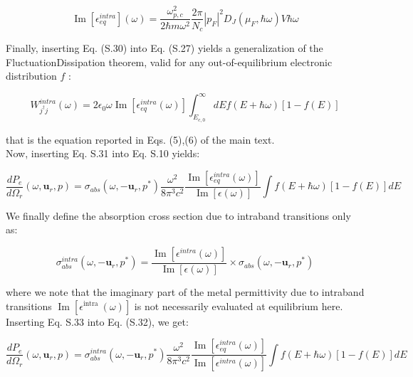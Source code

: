 \documentclass[10pt]{article}
\begin{document}
\begin{equation*}
\operatorname{Im}\left[\epsilon_{e q}^{i n t r a}\right](\omega)=\frac{\omega_{p, c}^{2}}{2 \hbar m \omega^{2}} \frac{2 \pi}{N_{c}}\left|p_{F}\right|^{2} D_{J}\left(\mu_{F}, \hbar \omega\right) V \hbar \omega \tag{S.30}
\end{equation*}


Finally, inserting Eq. (S.30) into Eq. (S.27) yields a generalization of the FluctuationDissipation theorem, valid for any out-of-equilibrium electronic distribution $f$ :


\begin{equation*}
W_{j^{\dagger} j}^{i n t r a}(\omega)=2 \epsilon_{0} \omega \operatorname{Im}\left[\epsilon_{e q}^{i n t r a}(\omega)\right] \int_{E_{c, 0}}^{\infty} d E f(E+\hbar \omega)[1-f(E)] \tag{S.31}
\end{equation*}


that is the equation reported in Eqs. (5),(6) of the main text.\\
Now, inserting Eq. S.31 into Eq. S.10 yields:


\begin{equation*}
\frac{d P_{e}}{d \Omega_{r}}\left(\omega, \boldsymbol{u}_{r}, p\right)=\sigma_{a b s}\left(\omega,-\boldsymbol{u}_{r}, p^{*}\right) \frac{\omega^{2}}{8 \pi^{3} c^{2}} \frac{\operatorname{Im}\left[\epsilon_{e q}^{i n t r a}(\omega)\right]}{\operatorname{Im}[\epsilon(\omega)]} \int f(E+\hbar \omega)[1-f(E)] d E \tag{S.32}
\end{equation*}


We finally define the absorption cross section due to intraband transitions only as:


\begin{equation*}
\sigma_{a b s}^{i n t r a}\left(\omega,-\boldsymbol{u}_{r}, p^{*}\right)=\frac{\operatorname{Im}\left[\epsilon^{i n t r a}(\omega)\right]}{\operatorname{Im}[\epsilon(\omega)]} \times \sigma_{a b s}\left(\omega,-\boldsymbol{u}_{r}, p^{*}\right) \tag{S.33}
\end{equation*}


where we note that the imaginary part of the metal permittivity due to intraband transitions $\operatorname{Im}\left[\epsilon^{\text {intra }}(\omega)\right]$ is not necessarily evaluated at equilibrium here. Inserting Eq. S.33 into Eq. (S.32), we get:


\begin{equation*}
\frac{d P_{e}}{d \Omega_{r}}\left(\omega, \boldsymbol{u}_{r}, p\right)=\sigma_{a b s}^{i n t r a}\left(\omega,-\boldsymbol{u}_{r}, p^{*}\right) \frac{\omega^{2}}{8 \pi^{3} c^{2}} \frac{\operatorname{Im}\left[\epsilon_{e q}^{i n t r a}(\omega)\right]}{\operatorname{Im}\left[\epsilon^{i n t r a}(\omega)\right]} \int f(E+\hbar \omega)[1-f(E)] d E \tag{S.34}
\end{equation*}
\end{document}

